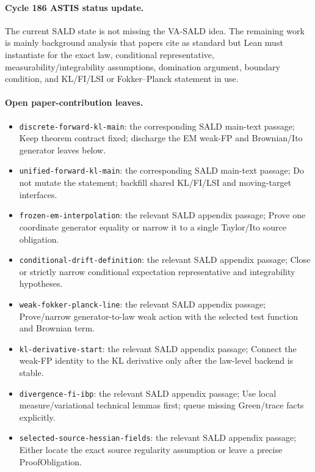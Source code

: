 \paragraph{Cycle 186 ASTIS status update.}
The current SALD state is not missing the VA-SALD idea.  The remaining work is mainly background analysis that papers cite as standard but Lean must instantiate for the exact law, conditional representative, measurability/integrability assumptions, domination argument, boundary condition, and KL/FI/LSI or Fokker--Planck statement in use.

\paragraph{Open paper-contribution leaves.}
\begin{itemize}
\item \texttt{discrete-forward-kl-main}: the corresponding SALD main-text passage; Keep theorem contract fixed; discharge the EM weak-FP and Brownian/Ito generator leaves below.
\item \texttt{unified-forward-kl-main}: the corresponding SALD main-text passage; Do not mutate the statement; backfill shared KL/FI/LSI and moving-target interfaces.
\item \texttt{frozen-em-interpolation}: the relevant SALD appendix passage; Prove one coordinate generator equality or narrow it to a single Taylor/Ito source obligation.
\item \texttt{conditional-drift-definition}: the relevant SALD appendix passage; Close or strictly narrow conditional expectation representative and integrability hypotheses.
\item \texttt{weak-fokker-planck-line}: the relevant SALD appendix passage; Prove/narrow generator-to-law weak action with the selected test function and Brownian term.
\item \texttt{kl-derivative-start}: the relevant SALD appendix passage; Connect the weak-FP identity to the KL derivative only after the law-level backend is stable.
\item \texttt{divergence-fi-ibp}: the relevant SALD appendix passage; Use local measure/variational technical lemmas first; queue missing Green/trace facts explicitly.
\item \texttt{selected-source-hessian-fields}: the relevant SALD appendix passage; Either locate the exact source regularity assumption or leave a precise ProofObligation.
\end{itemize}

